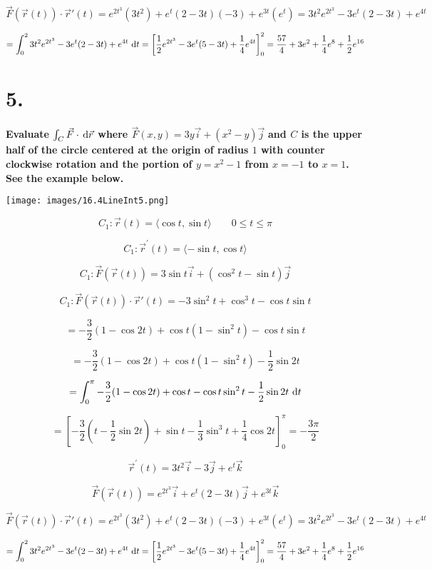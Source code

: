 \documentclass{scrartcl}
\DeclareRobustCommand*\d
{\ifmmode\mathop{}\!\mathrm{d}\else\expandafter\originald\fi}
\begin{document}
\[\vec{F}(\vec{r}(t))\cdot \vec{r}{\prime}(t) =e^{2t^{3}}	(3t^2)+e^{t}(2-3t)(-3)+e^{3t}(e^t) =3t^2e^{2t^{3}}-3e^t(2-3t)+e^{4t}\]

\[=\int_{0}^{2} 3t^2e^{2t^{3}}-3e^t(2-3t)+e^{4t} \, \d t =\left[\frac{1}{2}e^{2t^{3}}-3e^t(5-3t)+\frac{1}{4}e^{4t}\right]_{0}^{2} = \frac{57}{4}+3e^2+\frac{1}{4}e^8+\frac{1}{2}e^{16}\]

\section*{5.}

\textbf{Evaluate $\int_{C}^{} \vec{F} \cdot \, \d \vec{r}$ where $\vec{F}(x,y)=3y\vec{i}+(x^2-y)\vec{j}$}
\textbf{and $C$ is the upper half of the circle centered at the origin of radius $1$ with counter clockwise rotation and the portion of $y=x^2-1$ from $x=-1$ to $x=1$. See the example below.}

\texttt{[image: images/16.4LineInt5.png]}

\[C_1: \vec{r}(t)= \langle \cos{t},\sin{t}\rangle \qquad 0 \leq t \leq \pi\]

\[C_1: \vec{r}^{\prime}(t)= \langle -\sin{t}, \cos{t}\rangle\]

\[C_1: \vec{F}(\vec{r}(t))= 3\sin{t}\vec{i}+(\cos^2{t}-\sin{t})\vec{j}\]

\[C_1: \vec{F}(\vec{r}(t))\cdot \vec{r}{\prime}(t) = -3\sin^2{t}+\cos ^3{t}-\cos{t}\sin{t}\]

\[= -\frac{3}{2}(1-\cos{2t})+\cos{t}(1-\sin^2{t})-\cos{t}\sin{t}\]

\[= -\frac{3}{2}(1-\cos{2t})+\cos{t}(1-\sin^2{t})-\frac{1}{2}\sin{2t}\]

\[= \int_{0}^{\pi}-\frac{3}{2}(1-\cos{2t})+\cos{t}-\cos{t}\sin^2{t}-\frac{1}{2}\sin{2t} \, \d t\]

\[=\left[-\frac{3}{2}(t-\frac{1}{2}\sin{2t})+\sin{t}-\frac{1}{3}\sin^3{t}+\frac{1}{4}\cos{2t}\right]_{0}^{\pi}=-\frac{3\pi}{2}\]

\[\vec{r}^{\prime}(t)= 3t^2\vec{i}-3\vec{j}+e^t\vec{k}\]

\[\vec{F}(\vec{r}(t))= e^{2t^{3}}\vec{i}+e^{t}(2-3t)\vec{j}+e^{3t}\vec{k}\]

\[\vec{F}(\vec{r}(t))\cdot \vec{r}{\prime}(t) =e^{2t^{3}}	(3t^2)+e^{t}(2-3t)(-3)+e^{3t}(e^t) =3t^2e^{2t^{3}}-3e^t(2-3t)+e^{4t}\]

\[=\int_{0}^{2} 3t^2e^{2t^{3}}-3e^t(2-3t)+e^{4t} \, \d t =\left[\frac{1}{2}e^{2t^{3}}-3e^t(5-3t)+\frac{1}{4}e^{4t}\right]_{0}^{2} = \frac{57}{4}+3e^2+\frac{1}{4}e^8+\frac{1}{2}e^{16}\]
\end{document}
